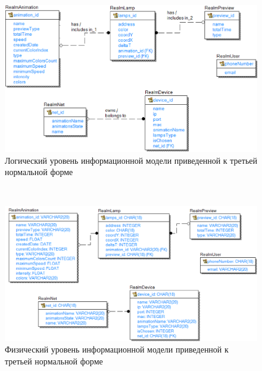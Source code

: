 \newpage
{}
\label{app:er}

~
\begin{figure}[H]
\centering
	\includegraphics[scale=0.6]{figures/diagrams/er_diagram_logic.png}
	\caption{Логический уровень информационной модели приведенной к третьей нормальной форме}
	\label{fig:appendices:er}
\end{figure}

~
\begin{figure}[H]
\centering
	\includegraphics[scale=0.6]{figures/diagrams/er_diagram_physical.png}
	\caption{Физический уровень информационной модели приведенной к третьей нормальной форме}
	\label{fig:appendices:er}
\end{figure}
